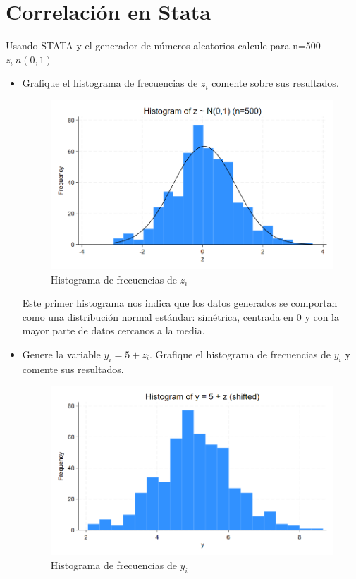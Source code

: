 \documentclass[12pt]{article}
\begin{document}
\section{Correlación en Stata}

Usando STATA y el generador de números aleatorios calcule para n=500
$z_i~n(0,1)$

\begin{itemize}
    \item Grafique el histograma de frecuencias de $z_i$ comente sobre sus resultados.

    \begin{figure}[h]
        \centering
        \includegraphics[width=0.75\linewidth]{Figures/hist_z.png}
        \caption{Histograma de frecuencias de $z_i$}
        \label{fig:Hist_z}
    \end{figure}

   
Este primer histograma nos indica que los datos generados se comportan como una distribución normal estándar: simétrica, centrada en 0 y con la mayor parte de datos cercanos a la media.

    \item Genere la variable $y_i=5+z_i$. Grafique el histograma de frecuencias de $y_i$ y comente sus resultados.

    \begin{figure}[h!]
        \centering
        \includegraphics[width=0.75\linewidth]{Figures/hist_y.png}
        \caption{Histograma de frecuencias de $y_i$}
        \label{fig:Hist_y}
    \end{figure}


\end{itemize}
\end{document}
